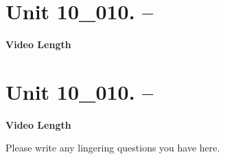 \documentclass[letterpaper,12pt]{exam}
\newcommand{\unit}{Unit 10}
\begin{document}
\begin{questions}
\section*{\unit\_010. -- } 
\par{\selectfont\textbf{Video Length }}

\section*{\unit\_010. -- } 
\par{\selectfont\textbf{Video Length }}



Please write any lingering questions you have here.


\end{questions}
\end{document}
